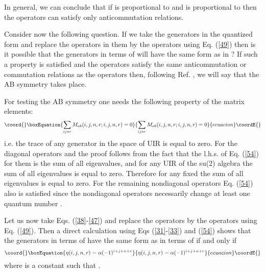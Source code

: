\documentclass[a4paper,12pt]{article}%
\begin{document}
In general, we can conclude that if \coordHE{} is proportional
to \coordHE{} and \coordHE{} is proportional to \coordHE{} then the
\coordHE{} operators can satisfy only anticommutation
relations.

Consider now the following question. If we take the
generators in the quantized form and 
replace the \coordHE{} operators in them by the
\coordHE{} operators using Eq. (\ref{49}) then is
it possible that the generators in terms of
\coordHE{} will have the same form as in \coordHE{}?
If such a property is satisfied and the 
\coordHE{} operators satisfy the same anticommutation 
or commutation relations as the \coordHE{} operators 
then, following Ref. \cite{lev2}, we will say that 
the AB symmetry takes place.

For testing the AB symmetry one needs the following
property of the matrix elements:
\begin{equation}\coord{}\boxEquation{
\sum_{ijnr} M_{ab}(i,j,n,r;i,j,n,r)=0
\label{54}
}{
\sum_{ijnr} M_{ab}(i,j,n,r;i,j,n,r)=0
}{ecuacion}\coordE{}\end{equation}
i.e. the trace of any generator in the space of UIR
is equal to zero. For the diagonal operators \coordHE{}
and \coordHE{} the proof follows from the fact that the
l.h.s. of Eq. (\ref{54}) for them is the sum of all
eigenvalues, and for any UIR
of the su(2) algebra the sum of all eigenvalues is
equal to zero. Therefore for any fixed \coordHE{} the
sum of all eigenvalues is equal to zero. For the
remaining nondiagonal operators Eq. (\ref{54})
also is satisfied since the nondiagonal 
operators necessarily change at least one quantum
number \coordHE{}. 

Let us now take Eqs. (\ref{38}-\ref{47}) and replace
the \coordHE{} operators by the \coordHE{} operators
using Eq. (\ref{49}). Then a direct calculation using 
Eqs (\ref{31}-\ref{33}) and (\ref{54}) shows that
the generators in terms of \coordHE{} have the same
form as in terms of \coordHE{} if and only if
\begin{equation}\coord{}\boxEquation{
\eta(i,j,n,r)=\alpha (-1)^{i+j+n+r}
\label{55}
}{
\eta(i,j,n,r)=\alpha (-1)^{i+j+n+r}
}{ecuacion}\coordE{}\end{equation} 
where \myHighlight{$\alpha$}\coordHE{} is a constant such that 
\coordHE{}.
\end{document}
